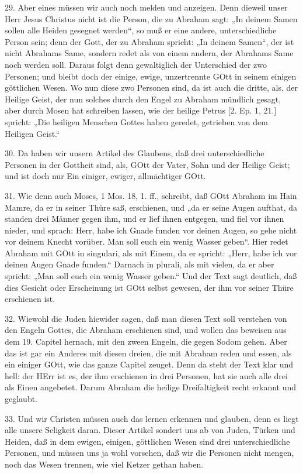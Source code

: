 29. Aber eines müssen wir auch noch melden und anzeigen. Denn dieweil unser Herr Jesus Christus nicht ist die Person, die zu Abraham sagt: „In deinem Samen sollen alle Heiden gesegnet werden“, so muß er eine andere, unterschiedliche Person sein; denn der Gott, der zu Abraham spricht: „In deinem Samen“,
der ist nicht Abrahams Same, sondern redet als von einem andern, der Abrahams Same noch werden soll. Daraus folgt denn gewaltiglich der Unterschied der zwo Personen; und bleibt doch der einige, ewige, unzertrennte GOtt in seinem einigen göttlichen Wesen. Wo nun diese zwo Personen sind, da ist auch die dritte, als, der Heilige Geist, der nun solches durch den Engel zu Abraham mündlich gesagt, aber durch Mosen hat schreiben lassen, wie der heilige Petrus [2. Ep. 1, 21.] spricht: „Die heiligen Menschen Gottes haben geredet, getrieben von dem Heiligen Geist.“

30. Da haben wir unsern Artikel des Glaubens, daß drei unterschiedliche Personen in der Gottheit sind, als, GOtt der Vater, Sohn und der Heilige Geist; und ist doch nur Ein einiger, ewiger, allmächtiger GOtt.

31. Wie denn auch Moses, 1 Mos. 18, 1. ff., schreibt, daß GOtt Abraham im Hain Mamre, da er in seiner Thüre saß, erschienen, und „da er seine Augen aufthat, da standen drei Männer gegen ihm, und er lief ihnen entgegen, und fiel vor ihnen nieder, und sprach: Herr, habe ich Gnade funden vor deinen Augen, so gehe nicht vor deinem Knecht vorüber. Man soll euch ein wenig Wasser geben“. Hier redet Abraham mit GOtt in singulari, als mit Einem, da er spricht: „Herr, habe ich vor deinen Augen Gnade funden.“ Darnach in plurali, als mit vielen, da er aber spricht: „Man soll euch ein wenig Wasser geben.“ Und der Text sagt deutlich, daß dies Gesicht oder Erscheinung ist GOtt selbst gewesen, der ihm vor seiner Thüre erschienen ist.

32. Wiewohl die Juden hiewider sagen, daß man diesen Text soll verstehen von den Engeln Gottes, die Abraham erschienen sind, und wollen das beweisen aus dem 19. Capitel hernach, mit den zween Engeln, die gegen Sodom gehen. Aber das ist gar ein Anderes mit diesen dreien, die mit Abraham reden und essen, als ein einiger GOtt, wie das ganze Capitel zeuget. Denn da steht der Text klar und hell: der HErr ist es, der ihm erschienen in drei Personen, hat sie auch alle drei als Einen angebetet. Darum Abraham die heilige Dreifaltigkeit recht erkannt und geglaubt.

33. Und wir Christen müssen auch das lernen erkennen und glauben, denn es liegt alle unsere Seligkeit daran. Dieser Artikel sondert uns ab von Juden, Türken und Heiden, daß in dem ewigen, einigen, göttlichen Wesen sind drei unterschiedliche Personen, und müssen uns ja wohl vorsehen, daß wir die Personen nicht mengen, noch das Wesen trennen, wie viel Ketzer gethan haben.

